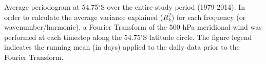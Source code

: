 \label{fig:fourier_spectrum}
Average periodogram at 54.75$^{\circ}$S over the entire study period (1979-2014). In order to calculate the average variance explained ($R_k^2$) for each frequency (or wavenumber/harmonic), a Fourier Transform of the 500 hPa meridional wind was performed at each timestep along the 54.75$^{\circ}$S latitude circle. The figure legend indicates the running mean (in days) applied to the daily data prior to the Fourier Transform. 